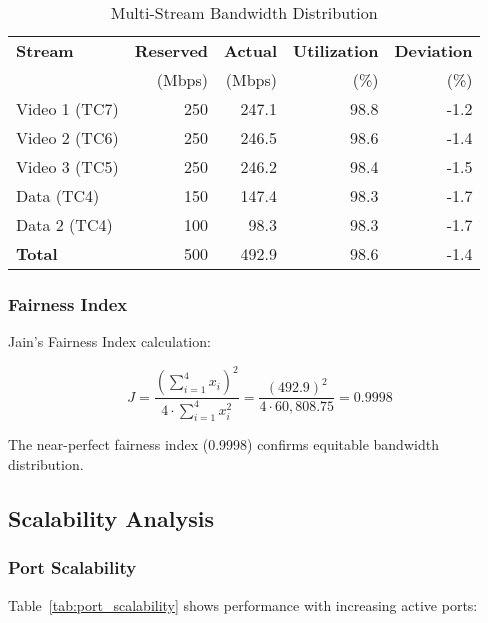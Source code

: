 \documentclass[10pt, journal, compsoc]{IEEEtran}
\begin{document}
\begin{table}[h]
\centering
\caption{Multi-Stream Bandwidth Distribution}
\label{tab:fairness}
\begin{tabular}{lrrrr}
\toprule
\textbf{Stream} & \textbf{Reserved} & \textbf{Actual} & \textbf{Utilization} & \textbf{Deviation} \\
 & (Mbps) & (Mbps) & (\%) & (\%) \\
\midrule
Video 1 (TC7) & 250 & 247.1 & 98.8 & -1.2 \\
Video 2 (TC6) & 250 & 246.5 & 98.6 & -1.4 \\
Video 3 (TC5) & 250 & 246.2 & 98.4 & -1.5 \\
Data (TC4) & 150 & 147.4 & 98.3 & -1.7 \\
Data 2 (TC4) & 100 & 98.3 & 98.3 & -1.7 \\
\midrule
\textbf{Total} & 500 & 492.9 & 98.6 & -1.4 \\
\bottomrule
\end{tabular}
\end{table}

\subsubsection{Fairness Index}

Jain's Fairness Index calculation:

\begin{equation}
J = \frac{(\sum_{i=1}^{4} x_i)^2}{4 \cdot \sum_{i=1}^{4} x_i^2} = \frac{(492.9)^2}{4 \cdot 60,808.75} = 0.9998
\end{equation}

The near-perfect fairness index (0.9998) confirms equitable bandwidth distribution.

\subsection{Scalability Analysis}

\subsubsection{Port Scalability}

Table~\ref{tab:port_scalability} shows performance with increasing active ports:
\end{document}
